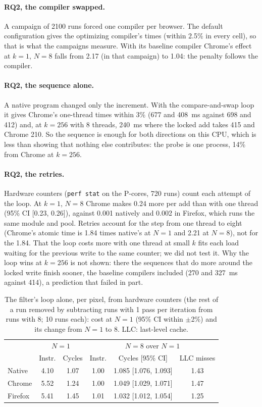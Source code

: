 \documentclass[sigplan]{acmart}
\begin{document}
\paragraph{RQ2, the compiler swapped.} A campaign of 2100 runs forced one
compiler per browser. The default configuration gives the optimizing
compiler's times (within 2.5\% in every cell), so that is what the
campaigns measure. With its baseline compiler Chrome's effect at $k=1$,
$N=8$ falls from 2.17 (in that campaign) to 1.04: the penalty follows the
compiler.

\paragraph{RQ2, the sequence alone.} A native program changed only the
increment. With the compare-and-swap loop it gives Chrome's one-thread
times within 3\% (677 and 408~ms against 698 and 412) and, at $k=256$ with
8 threads, 240~ms where the locked add takes 415 and Chrome 210. So the
sequence is enough for both directions on this CPU, which is less than
showing that nothing else contributes: the probe is one process, 14\% from
Chrome at $k=256$.

\paragraph{RQ2, the retries.} Hardware counters (\texttt{perf stat} on the
P-cores, 720 runs) count each attempt of the loop. At $k=1$, $N=8$ Chrome
makes 0.24 more per add than with one thread (95\% CI [0.23, 0.26]),
against 0.001 natively and 0.002 in Firefox, which runs the same module and
pool. Retries account for the step from one thread to eight (Chrome's
atomic time is 1.84 times native's at $N=1$ and 2.21 at $N=8$), not for the
1.84. That the loop costs more with one thread at small $k$ fits each load
waiting for the previous write to the same counter; we did not test it. Why
the loop wins at $k=256$ is not shown: there the sequences that do more
around the locked write finish sooner, the baseline compilers included (270
and 327~ms against 414), a prediction that failed in part.

\begin{table}[t]
\caption{The filter's loop alone, per pixel, from hardware counters (the
rest of a run removed by subtracting runs with 1 pass per iteration from
runs with 8; 10 runs each): cost at $N=1$ (95\% CI within $\pm$2\%) and its
change from $N=1$ to 8. LLC: last-level cache.}
\label{tab:filter}
\footnotesize
\setlength{\tabcolsep}{3pt}
\begin{tabular}{lccccc}
\toprule
& \multicolumn{2}{c}{$N=1$} & \multicolumn{3}{c}{$N=8$ over $N=1$} \\
& Instr. & Cycles & Instr. & Cycles [95\% CI] & LLC misses \\
\midrule
Native & 4.10 & 1.07 & 1.00 & 1.085 [1.076, 1.093] & 1.43 \\
Chrome & 5.52 & 1.24 & 1.00 & 1.049 [1.029, 1.071] & 1.47 \\
Firefox & 5.41 & 1.45 & 1.01 & 1.032 [1.012, 1.054] & 1.25 \\
\bottomrule
\end{tabular}
\end{table}
\end{document}
